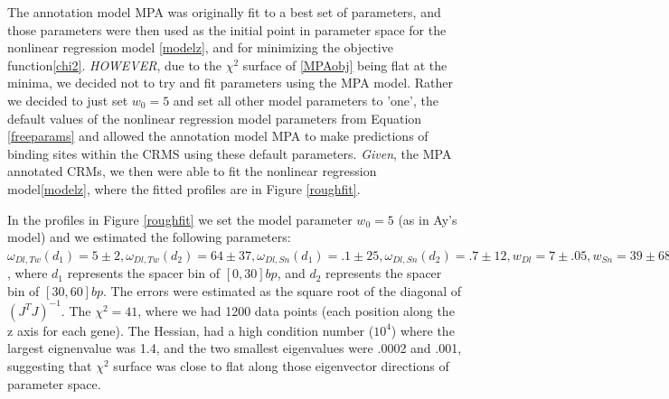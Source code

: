 The annotation model MPA was originally fit to a best set of parameters, and those parameters were then used as the initial point in parameter space for the nonlinear regression model \ref{modelz}, and for minimizing the objective function\ref{chi2}.  \emph{HOWEVER}, due to the $\chi^2$ surface of \ref{MPAobj} being flat at the minima, we decided not to try and fit parameters using the MPA model. Rather we decided to just set $w_0 =5$ and set all other model parameters to 'one', the default values of the nonlinear regression model parameters from Equation \ref{freeparams} and allowed the annotation model MPA to make predictions of binding sites within the CRMS using these default parameters.  \emph{Given}, the MPA annotated CRMs, we then were able to fit the nonlinear regression model\ref{modelz}, where the fitted profiles are in Figure \ref{roughfit}.

In the profiles in Figure \ref{roughfit} we set the model parameter $w_0 =5$ (as in Ay's model) and we estimated the following parameters: $\omega_{Dl,Tw}(d_1)= 5\pm 2 , 	\omega_{Dl,Tw}(d_2) = 64\pm 37 , 	\omega_{Dl,Sn}(d_1)=.1 \pm 25 ,	\omega_{Dl,Sn}(d_2)=.7 \pm 12,	w_{Dl}=7 \pm .05	,w_{Sn}=39 \pm 687 $, where $d_1$ represents the spacer bin of $[0,30]bp$, and $d_2$ represents the spacer bin of $[30,60]bp$.  The errors were estimated as the square root of the diagonal of $(J^TJ)^{-1}$.  The $\chi^2=41$, where we had 1200 data points (each position along the z axis for each gene).  The Hessian, had a high condition number ($10^4$) where the largest eignenvalue was 1.4, and the two smallest eigenvalues were .0002 and .001, suggesting that $\chi^2$ surface was close to flat along those eigenvector directions of parameter space.



%	
%	
%

